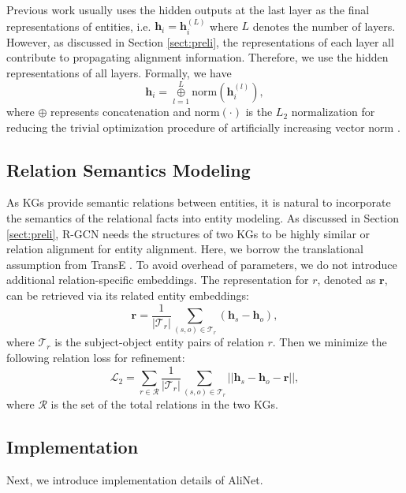 \documentclass[letterpaper]{article} \usepackage{aaai20}  \usepackage{times}  \usepackage{helvet} \usepackage{courier}  \usepackage[hyphens]{url}  \usepackage{graphicx} \urlstyle{rm} \def\UrlFont{\rm}  \frenchspacing  \setlength{\pdfpagewidth}{8.5in}  \setlength{\pdfpageheight}{11in}  \usepackage{amsmath}
\begin{document}
Previous work usually uses the hidden outputs at the last layer as the final representations of entities, i.e. $\mathbf{h}_i=\mathbf{h}^{(L)}_i$ where $L$ denotes the number of layers. However, as discussed in Section \ref{sect:preli}, the representations of each layer all contribute to propagating alignment information. Therefore, we use the hidden representations of all layers. Formally, we have
\begin{equation}\label{eq:concat}
\mathbf{h}_i = \mathop{\oplus}\limits_{l=1}^L\text{norm}(\mathbf{h}_i^{(l)}),
\end{equation}
where $\oplus$ represents concatenation and $\text{norm}(\cdot)$ is the $L_2$ normalization for reducing the trivial optimization procedure of artificially increasing vector norm \cite{TransE}.

\subsection{Relation Semantics Modeling}
As KGs provide semantic relations between entities, it is natural to incorporate the semantics of the relational facts into entity modeling. As discussed in Section \ref{sect:preli}, R-GCN needs the structures of two KGs to be highly similar or relation alignment for entity alignment. Here, we borrow the translational assumption from TransE \cite{TransE}. To avoid overhead of parameters, we do not introduce additional relation-specific embeddings. The representation for $r$, denoted as $\mathbf{r}$, can be retrieved via its related entity embeddings:
\begin{equation} 
	\label{eq:relation}
	\mathbf{r} =\frac{1}{|\mathcal{T}_r|} \sum_{(s,o) \in \mathcal{T}_r}(\mathbf{h}_s-\mathbf{h}_o),
\end{equation}
where $\mathcal{T}_r$ is the subject-object entity pairs of relation $r$. Then we minimize the following relation loss for refinement:
\begin{equation} 
	\label{eq:trans_loss}
	\mathcal{L}_2 = \sum_{r\in \mathcal{R}}\frac{1}{|\mathcal{T}_r|} \sum_{(s,o) \in \mathcal{T}_r}||\mathbf{h}_s-\mathbf{h}_o-\mathbf{r}||,
\end{equation}
where $\mathcal{R}$ is the set of the total relations in the two KGs.

\subsection{Implementation}
Next, we introduce implementation details of AliNet.
\end{document}
